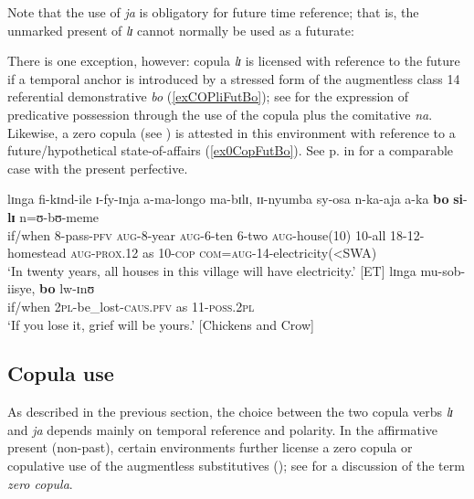 Note that the use of \textit{ja} is obligatory for future time reference; that is, the unmarked present of \textit{lɪ} cannot normally be used as a futurate:

\begin{exe}
\end{exe}

There is one exception, however: copula \textit{lɪ} is licensed with reference to the future if a temporal anchor is introduced by a stressed form of the augmentless class 14 referential demonstrative \textit{bo} (\ref{exCOPliFutBo}); see  for the expression of predicative possession through the use of the copula plus the comitative \textit{na}. Likewise, a zero copula (see ) is attested in this environment with reference to a future/hypothetical state-of-affairs (\ref{ex0CopFutBo}). See p.\nobreakspace\pageref{exPFVboFuture} in  for a comparable case with the present perfective.
\begin{exe}
\ex \label{exCOPliFutBo}
\gll lɪnga fi-kɪnd-ile ɪ-fy-ɪnja a-ma-longo ma-bɪlɪ, ɪɪ-nyumba sy-osa n-ka-aja a-ka \textbf{bo} \textbf{si}-\textbf{lɪ} n=ʊ-bʊ-meme\\
if/when 8-pass-\textsc{pfv} \textsc{aug}-8-year \textsc{aug}-6-ten 6-two \textsc{aug}-house(10) 10-all 18-12-homestead \textsc{aug}-\textsc{prox}.12 as 10-\textsc{cop} \textsc{com}=\textsc{aug}-14-electricity(<SWA)\\
\glt \lq In twenty years, all houses in this village will have electricity.' [ET]
\ex \label{ex0CopFutBo}
\gll lɪnga mu-sob-iisye, \textbf{bo} lw-ɪnʊ\\
if/when \textsc{2pl}-be\_lost-\textsc{caus.pfv} as 11-\textsc{poss.2pl}\\
\glt \lq If you lose it, grief will be yours.' [Chickens and Crow]
\end{exe}

\subsection{Copula use}\label{CopulaUse}
As described in the previous section, the choice between the two copula verbs \textit{lɪ} and \textit{ja} depends mainly on temporal reference and polarity. In the affirmative present (non-past), certain environments further license a zero copula or copulative use of the augmentless substitutives (); see \citet{StassenL2005} for a discussion of the term \textit{zero copula}.

